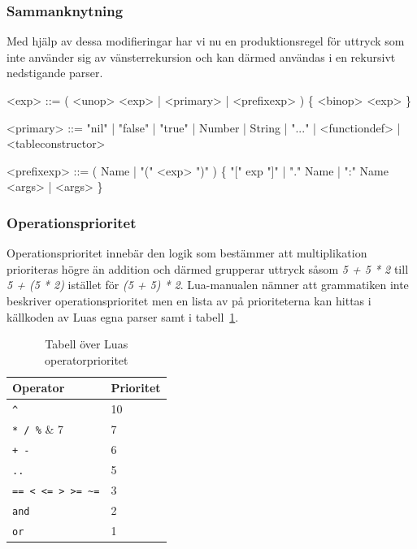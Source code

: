 \subsubsection{Sammanknytning}

Med hjälp av dessa modifieringar har vi nu en produktionsregel för uttryck som
inte använder sig av vänsterrekursion och kan därmed användas i en rekursivt
nedstigande parser.

\setlength{\grammarindent}{6em}
\begin{grammar}
  \singlespace\small%
  \selectfont
  <exp> ::= ( <unop> <exp> | <primary> | <prefixexp> ) \{ <binop> <exp> \}

  <primary> ::= "nil" | "false" | "true" | Number | String | "..." |
      <functiondef> | <tableconstructor>

  <prefixexp> ::= ( Name | "(" <exp> ")" ) \{ "[" exp "]" | "." Name |
      ":" Name <args> | <args> \}
\end{grammar}

\subsubsection{Operationsprioritet}

Operationsprioritet innebär den logik som bestämmer att multiplikation
prioriteras högre än addition och därmed grupperar uttryck såsom \textit{5 + 5
* 2} till \textit{5 + (5 * 2)} istället för \textit{(5 + 5) * 2}. Lua-manualen
nämner att grammatiken inte beskriver operationsprioritet \citep{luaref} men
en lista av på prioriteterna kan hittas i källkoden av Luas egna parser
\citep{lparse} samt i tabell~\ref{tab:precedence}.

\begin{table}[ht]
  \caption{Tabell över Luas operatorprioritet}
  \begin{tabular}{l l}
    Operator & Prioritet \\
    \hline
    \verb|^| & 10 \\
    \verb|* / %| & 7 \\
    \verb|+ -| & 6 \\
    \verb|..| & 5 \\
    \verb|== < <= > >= ~=| & 3 \\
    \verb|and| & 2 \\
    \verb|or| & 1
  \end{tabular}
  \label{tab:precedence}
\end{table}

